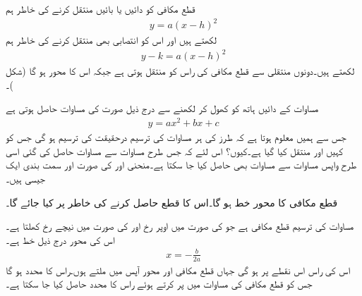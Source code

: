 
قطع مکافی  کو دائیں یا بائیں منتقل کرنے کی خاطر ہم
\begin{align}
y=a(x-h)^2
\end{align}
لکھتے ہیں اور اس کو انتصابی بھی منتقل کرنے کی خاطر ہم
\begin{align}\label{مساوات_ابتدا_دو_درجی_الف}
y-k=a(x-h)^2
\end{align}
لکھتے ہیں۔دونوں منتقلی سے قطع مکافی کی راس  کو منتقل ہوتی ہے جبکہ اس کا محور  ہو گا (شکل )۔

مساوات  کے دائیں ہاتھ کو کھول کر لکھنے سے درج ذیل صورت کی مساوات حاصل ہوتی ہے
\begin{align}\label{مساوات_ابتدا_دو_درجی_ب}
y=ax^2+bx+c
\end{align}
جس سے ہمیں معلوم ہوتا ہے کہ  طرز کی ہر مساوات کی ترسیم  درحقیقت  کی ترسیم ہو گی جس کو کہیں اور منتقل کیا گیا ہے۔کیوں؟ اس لئے کہ جس طرح مساوات  سے مساوات  حاصل کی گئی اسی طرح واپس مساوات  سے مساوات  بھی حاصل کیا جا سکتا ہے۔منحنی  اور  کی صورت اور سمت بندی ایک جیسی ہیں۔

قطع مکافی  کا محور خط  ہو گا۔اس کا قطع  حاصل کرنے کی خاطر  پر کیا جائے گا۔

\quad 
مساوات  کی ترسیم قطع مکافی ہے جو  کی صورت میں اوپر رخ اور  کی صورت میں نیچے رخ کھلتا ہے۔اس کی محور درج ذیل خط ہے۔
\begin{align}
x=-\frac{b}{2a}
\end{align} 
اس کی راس اس نقطے پر ہو گی جہاں قطع مکافی اور محور آپس میں ملتے ہوں۔راس کا  محدد  ہو گا جس کو قطع مکافی کی مساوات میں پر کرتے ہوئے راس کا  محدد حاصل کیا جا سکتا ہے۔

